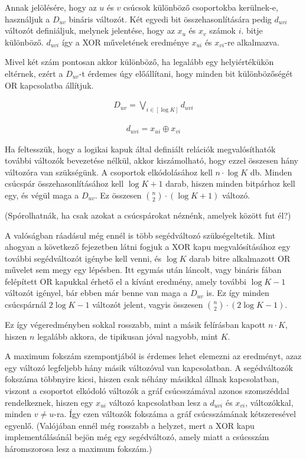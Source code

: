 Annak jelölésére, hogy az $u$ és $v$ csúcsok különböző csoportokba kerülnek-e, használjuk a $D_{uv}$ bináris változót. Két egyedi bit összehasonlítására pedig $d_{uvi}$ változót definiáljuk, melynek jelentése, hogy az $x_u$ és $x_v$ számok $i.$ bitje különböző. $d_{uvi}$ így a XOR műveletének eredménye $x_{ui}$ és  $x_{vi}$-re alkalmazva.

Mivel két szám pontosan akkor különböző, ha legalább egy helyiértékükön eltérnek, ezért a $D_{uv}$-t érdemes úgy előállítani, hogy minden bit különbözőségét OR kapcsolatba állítjuk.

\begin{align}
	D_{uv} = \bigvee_{i \in [ \log K ] }{d_{uvi}}
\end{align}


\begin{align}
	d_{uvi} = x_{ui} \oplus x_{vi}
\end{align}

Ha feltesszük, hogy a logikai kapuk által definiált relációk megvalósíthatók további változók bevezetése nélkül, akkor kiszámolható, hogy ezzel összesen hány változóra van szükségünk. A csoportok elkódolásához kell $n \cdot \log K$ db. Minden csúcspár összehasonlításához kell $\log K + 1$ darab, hiszen minden bitpárhoz kell egy, és végül maga a $D_{uv}$. Ez összesen $\binom{n}{2} \cdot ( \log K + 1 )$ változó.

(Spórolhatnák, ha csak azokat a csúcspárokat néznénk, amelyek között fut él?)

A valóságban ráadásul még ennél is több segédváltozó szükségeltetik. Mint ahogyan a következő fejezetben látni fogjuk a XOR kapu megvalósításához egy további segédváltozót igénybe kell venni, és $\log K$ darab bitre alkalmazott OR művelet sem megy egy lépésben. Itt egymás után láncolt, vagy bináris fában felépített OR kapukkal érhető el a kívánt eredmény, amely további $\log K -1$ változót igényel, bár ebben már benne van maga a $D_{uv}$ is. Ez így minden csúcspárnál $2\log K - 1$
 változót jelent, vagyis összesen $\binom{n}{2} \cdot (2\log K -  1 )$.
 
Ez így végeredményben sokkal rosszabb, mint a másik felírásban kapott $n \cdot K$, hiszen $n$ legalább akkora, de tipikusan jóval nagyobb, mint $K$.
 
A maximum fokszám szempontjából is érdemes lehet elemezni az eredményt, azaz egy változó legfeljebb hány másik változóval van kapcsolatban. A segédváltozók fokszáma többnyire kicsi, hiszen csak néhány másikkal állnak kapcsolatban, viszont a csoportot elkódoló változók a gráf csúcsszámával azonos szomszéddal rendelkeznek, hiszen egy $x_{ui}$ változó kapcsolatban lesz a $d_{uvi}$ és $x_{vi}$,  változókkal, minden $v \neq u$-ra. Így ezen változók fokszáma a gráf csúcsszámának kétszeresével egyenlő. (Valójában ennél még rosszabb a helyzet, mert a XOR kapu implementálásánál bejön még egy segédváltozó, amely miatt a csúcsszám háromszorosa lesz a maximum fokszám.)
 
